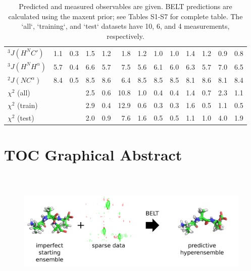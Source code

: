 \documentclass[journal=jacsat,manuscript=article]{achemso}
\begin{document}
\begin{table}
\begin{tabular}{lrrrrrrrrrrrr}
$^3J(H^NC\prime)$ &  1.1 &          0.3 &      1.5 &             1.2 &      1.8 &             1.2 &                1.0 &                       1.0 &       1.4 &              1.2 &     0.9 &            0.8 \\
$^3J(H^NH^\alpha)$     &  5.7 &          0.4 &      6.6 &             5.7 &      7.5 &             5.6 &                6.1 &                       6.0 &       6.3 &              5.7 &     7.0 &            6.5 \\
$^2J(NC^\alpha)$      &  8.4 &          0.5 &      8.5 &             8.6 &      6.4 &             8.5 &                8.5 &                       8.5 &       8.1 &              8.6 &     8.1 &            8.4 \\
$\chi^2$ (all)                           &    &            &      2.5 &             0.6 &     10.8 &             1.0 &                0.4 &                       0.4 &       1.4 &              0.7 &     2.3 &            1.1 \\
$\chi^2$ (train)                         &    &            &      2.9 &             0.4 &     12.9 &             0.6 &                0.3 &                       0.3 &       1.6 &              0.5 &     1.1 &            0.5 \\
$\chi^2$ (test)                          &    &            &      2.0 &             0.9 &      7.6 &             1.6 &                0.5 &                       0.5 &       1.1 &              1.0 &     4.0 &            1.9 \\
\bottomrule
\end{tabular}
\caption{
Predicted and measured observables are given.  BELT predictions are calculated using the maxent prior; see Tables S1-S7 for complete table.  The `all`, `training`, and `test` datasets have 10, 6, and 4 measurements, respectively.  
}
\label{table:Predictions}
\end{table}

\clearpage




\clearpage

\section{TOC Graphical Abstract}

\begin{figure}

\includegraphics[height=6.0cm]{figures/new_info_graphic/info_graphic.png}

\end{figure}
\end{document}
